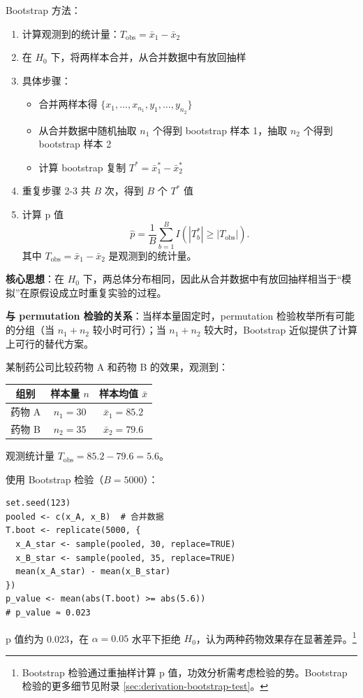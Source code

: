 Bootstrap 方法：
\begin{enumerate}
\item 计算观测到的统计量：$T_{\mathrm{obs}} = \bar{x}_1 - \bar{x}_2$
\item 在 $H_0$ 下，将两样本合并，从合并数据中有放回抽样
\item 具体步骤：
   \begin{itemize}
   \item 合并两样本得 $\{x_1, \ldots, x_{n_1}, y_1, \ldots, y_{n_2}\}$
   \item 从合并数据中随机抽取 $n_1$ 个得到 bootstrap 样本 1，抽取 $n_2$ 个得到 bootstrap 样本 2
   \item 计算 bootstrap 复制 $T^* = \bar{x}_1^* - \bar{x}_2^*$
   \end{itemize}
\item 重复步骤 2-3 共 $B$ 次，得到 $B$ 个 $T^*$ 值
\item 计算 p 值
\[
\hat{p} = \frac{1}{B}\sum_{b=1}^B I\!\left(|T_b^*| \geq |T_{\mathrm{obs}}|\right).
\label{eq:bootstrap-pvalue}
\]
其中 $T_{\mathrm{obs}} = \bar{x}_1 - \bar{x}_2$ 是观测到的统计量。
\end{enumerate}

\textbf{核心思想}：在 $H_0$ 下，两总体分布相同，因此从合并数据中有放回抽样相当于``模拟''在原假设成立时重复实验的过程。

\textbf{与 permutation 检验的关系}：当样本量固定时，permutation 检验枚举所有可能的分组（当 $n_1+n_2$ 较小时可行）；当 $n_1+n_2$ 较大时，Bootstrap 近似提供了计算上可行的替代方案。

\begin{example}\label{ex:two-sample-bootstrap-test}
某制药公司比较药物 A 和药物 B 的效果，观测到：

\begin{center}
\begin{tabular}{c|c|c}
\hline
组别 & 样本量 $n$ & 样本均值 $\bar{x}$ \\ \hline
药物 A & $n_1=30$ & $\bar{x}_1=85.2$ \\
药物 B & $n_2=35$ & $\bar{x}_2=79.6$ \\ \hline
\end{tabular}
\end{center}

观测统计量 $T_{\mathrm{obs}} = 85.2 - 79.6 = 5.6$。

使用 Bootstrap 检验（$B=5000$）：
\begin{verbatim}
set.seed(123)
pooled <- c(x_A, x_B)  # 合并数据
T.boot <- replicate(5000, {
  x_A_star <- sample(pooled, 30, replace=TRUE)
  x_B_star <- sample(pooled, 35, replace=TRUE)
  mean(x_A_star) - mean(x_B_star)
})
p_value <- mean(abs(T.boot) >= abs(5.6))
# p_value ≈ 0.023
\end{verbatim}

p 值约为 0.023，在 $\alpha=0.05$ 水平下拒绝 $H_0$，认为两种药物效果存在显著差异。\footnote{ Bootstrap 检验通过重抽样计算 p 值，功效分析需考虑检验的势。Bootstrap 检验的更多细节见附录 \cref{sec:derivation-bootstrap-test}。}
\end{example}

